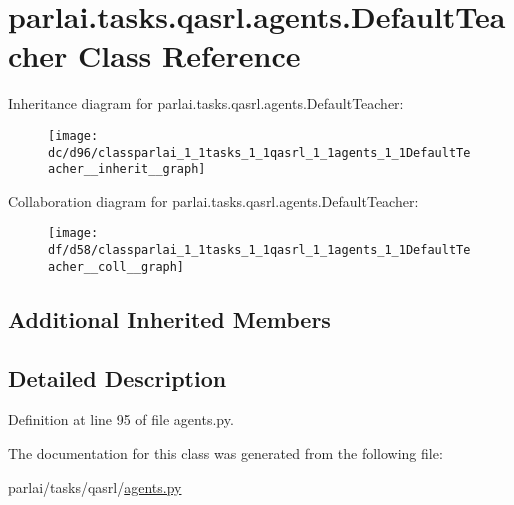 \hypertarget{classparlai_1_1tasks_1_1qasrl_1_1agents_1_1DefaultTeacher}{}\section{parlai.\+tasks.\+qasrl.\+agents.\+Default\+Teacher Class Reference}
\label{classparlai_1_1tasks_1_1qasrl_1_1agents_1_1DefaultTeacher}


Inheritance diagram for parlai.\+tasks.\+qasrl.\+agents.\+Default\+Teacher\+:
\nopagebreak
\begin{figure}[H]
\begin{center}
\leavevmode
\texttt{[image: dc/d96/classparlai\_1\_1tasks\_1\_1qasrl\_1\_1agents\_1\_1DefaultTeacher\_\_inherit\_\_graph]}
\end{center}
\end{figure}


Collaboration diagram for parlai.\+tasks.\+qasrl.\+agents.\+Default\+Teacher\+:
\nopagebreak
\begin{figure}[H]
\begin{center}
\leavevmode
\texttt{[image: df/d58/classparlai\_1\_1tasks\_1\_1qasrl\_1\_1agents\_1\_1DefaultTeacher\_\_coll\_\_graph]}
\end{center}
\end{figure}
\subsection*{Additional Inherited Members}


\subsection{Detailed Description}


Definition at line 95 of file agents.\+py.



The documentation for this class was generated from the following file\+:\begin{DoxyCompactItemize}
\item 
parlai/tasks/qasrl/\hyperlink{parlai_2tasks_2qasrl_2agents_8py}{agents.\+py}\end{DoxyCompactItemize}
